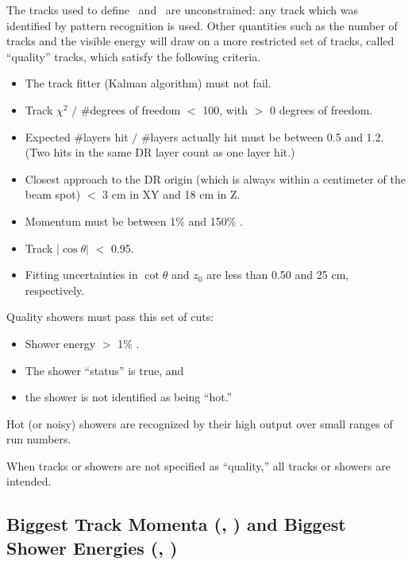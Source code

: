 The tracks used to define \dxy\ and \dz\ are unconstrained: any track
which was identified by pattern recognition is used.  Other quantities
such as the number of tracks and the visible energy will draw on a
more restricted set of tracks, called ``quality'' tracks, which
satisfy the following criteria.
\begin{itemize}
  \item The track fitter (Kalman algorithm) must not fail.

  \item Track $\chi^2$ $/$ \#degrees of freedom $<$ 100, with $>$ 0
    degrees of freedom.

  \item Expected \#layers hit $/$ \#layers actually hit must be
    between 0.5 and 1.2.  (Two hits in the same DR layer count as one
    layer hit.)

  \item \label{cuts:trackd0z0} Closest approach to the DR origin
    (which is always within a centimeter of the beam spot) $<$ 3 cm in
    XY and 18 cm in Z.

  \item Momentum must be between 1\% and 150\% \ebeam.

  \item Track $|\cos\theta|$ $<$ 0.95.

  \item Fitting uncertainties in $\cot\theta$ and $z_0$ are less than
    0.50 and 25 cm, respectively.
\end{itemize}
Quality showers must pass this set of cuts:
\begin{itemize}
  \item Shower energy $>$ 1\% \ebeam.

  \item The shower ``status'' is true, and

  \item the shower is not identified as being ``hot.''
\end{itemize}
Hot (or noisy) showers are recognized by their high output over small
ranges of run numbers.

When tracks or showers are not specified as ``quality,'' all tracks or
showers are intended.

\subsection{Biggest Track Momenta (\pone, \ptwo) and Biggest Shower
  Energies (\eone, \etwo)}

